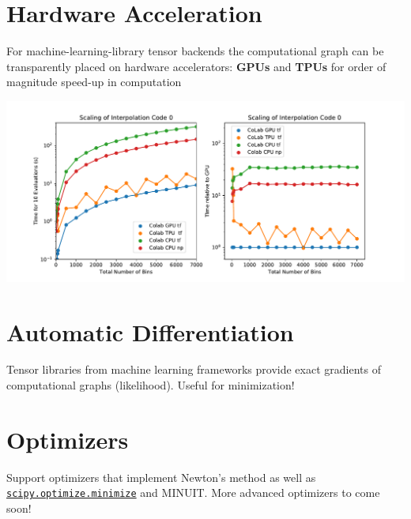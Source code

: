 \documentclass[princeton,portrait]{a0poster}
\begin{document}
\begin{multicols}{2}
 \section*{\LARGE\color{MediumBlue} Hardware Acceleration}
 For machine-learning-library tensor backends the computational graph can be transparently placed on hardware accelerators: \textbf{GPUs} and \textbf{TPUs} for order of magnitude speed-up in computation
 \begin{center}
  \includegraphics[width=\linewidth]{scaling_hardware.pdf}
 \end{center}

 \section*{\LARGE\color{MediumBlue} Automatic Differentiation}

 Tensor libraries from machine learning frameworks provide exact gradients of computational graphs (likelihood). Useful for minimization!

 \section*{\LARGE\color{MediumBlue} Optimizers}

 Support optimizers that implement Newton's method as well as \href{https://docs.scipy.org/doc/scipy/reference/generated/scipy.optimize.minimize.html}{\texttt{scipy.optimize.minimize}} and MINUIT.
 More advanced optimizers to come soon!


\end{multicols}
\end{document}
